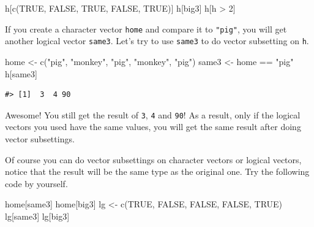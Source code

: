 \documentclass[
]{book}
\newenvironment{Shaded}{\begin{snugshade}}{\end{snugshade}}
\newcommand{\ConstantTok}[1]{\textcolor[rgb]{0.00,0.00,0.00}{#1}}
\newcommand{\DecValTok}[1]{\textcolor[rgb]{0.00,0.00,0.81}{#1}}
\newcommand{\FunctionTok}[1]{\textcolor[rgb]{0.00,0.00,0.00}{#1}}
\newcommand{\NormalTok}[1]{#1}
\newcommand{\OtherTok}[1]{\textcolor[rgb]{0.56,0.35,0.01}{#1}}
\newcommand{\SpecialCharTok}[1]{\textcolor[rgb]{0.00,0.00,0.00}{#1}}
\newcommand{\StringTok}[1]{\textcolor[rgb]{0.31,0.60,0.02}{#1}}
\begin{document}
\begin{Shaded}
\begin{Highlighting}[]
\NormalTok{h[}\FunctionTok{c}\NormalTok{(}\ConstantTok{TRUE}\NormalTok{, }\ConstantTok{FALSE}\NormalTok{, }\ConstantTok{TRUE}\NormalTok{, }\ConstantTok{FALSE}\NormalTok{, }\ConstantTok{TRUE}\NormalTok{)]}
\NormalTok{h[big3]}
\NormalTok{h[h }\SpecialCharTok{\textgreater{}} \DecValTok{2}\NormalTok{]}
\end{Highlighting}
\end{Shaded}

If you create a character vector \texttt{home} and compare it to \texttt{"pig"}, you will get another logical vector \texttt{same3}. Let's try to use \texttt{same3} to do vector subsetting on \texttt{h}.

\begin{Shaded}
\begin{Highlighting}[]
\NormalTok{home }\OtherTok{\textless{}{-}} \FunctionTok{c}\NormalTok{(}\StringTok{"pig"}\NormalTok{, }\StringTok{"monkey"}\NormalTok{, }\StringTok{"pig"}\NormalTok{, }\StringTok{"monkey"}\NormalTok{, }\StringTok{"pig"}\NormalTok{)}
\NormalTok{same3 }\OtherTok{\textless{}{-}}\NormalTok{ home }\SpecialCharTok{==} \StringTok{"pig"}
\NormalTok{h[same3]}
\end{Highlighting}
\end{Shaded}

\begin{verbatim}
#> [1]  3  4 90
\end{verbatim}

Awesome! You still get the result of \texttt{3}, \texttt{4} and \texttt{90}! As a result, only if the logical vectors you used have the same values, you will get the same result after doing vector subsettings.

Of course you can do vector subsettings on character vectors or logical vectors, notice that the result will be the same type as the original one. Try the following code by yourself.

\begin{Shaded}
\begin{Highlighting}[]
\NormalTok{home[same3]}
\NormalTok{home[big3]}
\NormalTok{lg }\OtherTok{\textless{}{-}} \FunctionTok{c}\NormalTok{(}\ConstantTok{TRUE}\NormalTok{, }\ConstantTok{FALSE}\NormalTok{, }\ConstantTok{FALSE}\NormalTok{, }\ConstantTok{FALSE}\NormalTok{, }\ConstantTok{TRUE}\NormalTok{)}
\NormalTok{lg[same3]}
\NormalTok{lg[big3]}
\end{Highlighting}
\end{Shaded}
\end{document}
